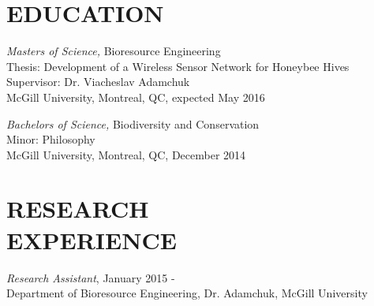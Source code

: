 \documentclass[margin, 10pt]{res} %
\begin{document}
\begin{resume}

% 
%
%

\section{EDUCATION}

{\sl Masters of Science,}  Bioresource Engineering \\
Thesis: Development of a Wireless Sensor Network for Honeybee Hives \\
Supervisor: Dr. Viacheslav Adamchuk\\
McGill University, Montreal, QC, expected May 2016 


{\sl Bachelors  of Science,}  Biodiversity and Conservation \\
Minor: Philosophy \\
McGill University, Montreal, QC, December 2014
 
\section{RESEARCH \\ EXPERIENCE}

{\sl Research Assistant}, January 2015 - \\
Department of Bioresource Engineering, Dr. Adamchuk, McGill University

 

\end{resume}
\end{document}

